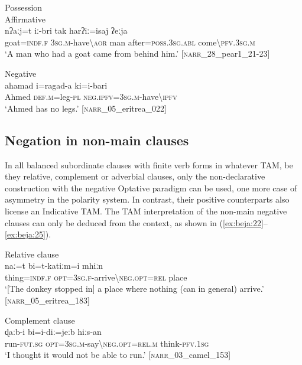 \documentclass[output=paper,colorlinks,citecolor=brown]{langscibook}
\begin{document}
\ea\label{ex:beja:21}
{Possession}\\

    \ea\label{ex:beja:21a}
    {Affirmative}\\
        \gll nʔaːj=t iː-bri tak harʔiː=isaj ʔeːja \\ 
             goat=\textsc{indf.f} \textsc{3sg.m}-have{\textbackslash}\textsc{aor} man  after=\textsc{poss.3sg.abl} come{\textbackslash}\textsc{pfv.3sg.m}\\
        \glt `A man who had a goat came from behind him.' [\textsc{narr}\_28\_pear1\_21-23]
    
    \ex\label{ex:beja:21b}
    {Negative}\\
        \gll ahamad i=ragad-a ki=i-bari\\
             Ahmed \textsc{def.m}=leg\textsc{-pl} \textsc{neg.ipfv=3sg.m-}have{\textbackslash}\textsc{ipfv}\\
        \glt `Ahmed has no legs.' [\textsc{narr}\_05\_eritrea\_022]
    \z
\z


\subsection{Negation in non-main clauses}
\label{sec:beja:2.4}

In all balanced subordinate clauses with finite verb forms in whatever TAM, be they relative, complement or adverbial clauses, only the non-declarative construction with the negative Optative paradigm can be used, one more case of asymmetry in the polarity system. In contrast, their positive counterparts also license an Indicative TAM. The TAM interpretation of the non-main negative clauses can only be deduced from the context, as shown in (\ref{ex:beja:22}--\ref{ex:beja:25}). 

\ea\label{ex:beja:22} 
{Relative clause}\\
    \gll naː=t bi=t-katiːm=i mhiːn\\
         thing=\textsc{indf.f} \textsc{opt=3sg.f}-arrive{\textbackslash}\textsc{neg.opt=rel} place\\
    \glt `[The donkey stopped in] a place where nothing (can in general) arrive.' [\textsc{narr}\_05\_eritrea\_183]
\z

\ea\label{ex:beja:23}
{Complement clause}\\
    \gll ɖaːb-i bi=i-diː=jeːb hiːs-an\\
         run-\textsc{fut.sg} \textsc{opt=3sg.m}-say{\textbackslash}\textsc{neg.opt=rel.m} think-\textsc{pfv.1sg}\\
    \glt `I thought it would not be able to run.' [\textsc{narr}\_03\_camel\_153]
\z 
\end{document}
